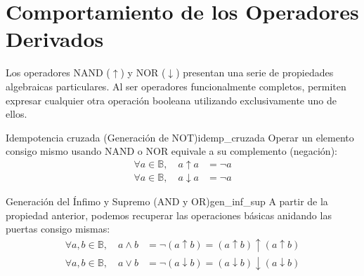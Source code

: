 \section{Comportamiento de los Operadores Derivados}
Los operadores NAND ($\uparrow$) y NOR ($\downarrow$) presentan una serie de propiedades algebraicas particulares. Al ser operadores funcionalmente completos, permiten expresar cualquier otra operación booleana utilizando exclusivamente uno de ellos.

\begin{teorema}{Idempotencia cruzada (Generación de NOT)}{idemp_cruzada}
Operar un elemento consigo mismo usando NAND o NOR equivale a su complemento (negación):
\begin{align*}
    \forall a \in \mathbb{B}, \quad a \uparrow a &= \neg a \\
    \forall a \in \mathbb{B}, \quad a \downarrow a &= \neg a
\end{align*}
\end{teorema}

\begin{teorema}{Generación del Ínfimo y Supremo (AND y OR)}{gen_inf_sup}
A partir de la propiedad anterior, podemos recuperar las operaciones básicas anidando las puertas consigo mismas:
\begin{align*}
    \forall a, b \in \mathbb{B}, \quad a \wedge b &= \neg (a \uparrow b) = (a \uparrow b) \uparrow (a \uparrow b) \\
    \forall a, b \in \mathbb{B}, \quad a \vee b &= \neg (a \downarrow b) = (a \downarrow b) \downarrow (a \downarrow b)
\end{align*}
\end{teorema}

